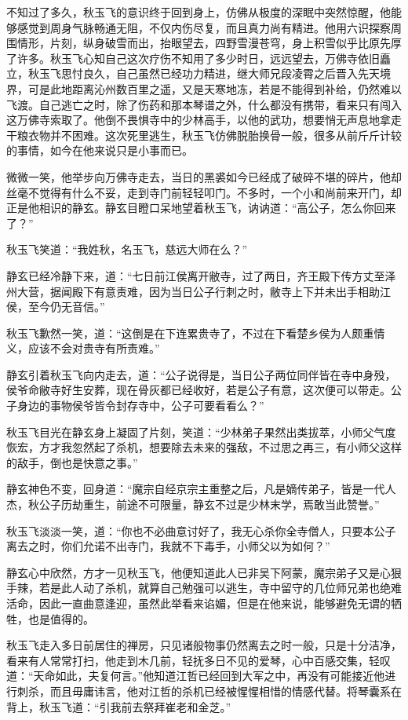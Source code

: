 不知过了多久，秋玉飞的意识终于回到身上，仿佛从极度的深眠中突然惊醒，他能够感觉到周身气脉畅通无阻，不仅内伤尽复，而且真力尚有精进。他用六识探察周围情形，片刻，纵身破雪而出，抬眼望去，四野雪漫苍穹，身上积雪似乎比原先厚了许多。秋玉飞心知自己这次疗伤不知用了多少时日，远远望去，万佛寺依旧矗立，秋玉飞思忖良久，自己虽然已经功力精进，继大师兄段凌霄之后晋入先天境界，可是此地距离沁州数百里之遥，又是天寒地冻，若是不能得到补给，仍然难以飞渡。自己逃亡之时，除了伤药和那本琴谱之外，什么都没有携带，看来只有闯入这万佛寺索取了。他倒不畏惧寺中的少林高手，以他的武功，想要悄无声息地拿走干粮衣物并不困难。这次死里逃生，秋玉飞仿佛脱胎换骨一般，很多从前斤斤计较的事情，如今在他来说只是小事而已。

微微一笑，他举步向万佛寺走去，当日的黑裘如今已经成了破碎不堪的碎片，他却丝毫不觉得有什么不妥，走到寺门前轻轻叩门。不多时，一个小和尚前来开门，却正是他相识的静玄。静玄目瞪口呆地望着秋玉飞，讷讷道：“高公子，怎么你回来了？”

秋玉飞笑道：“我姓秋，名玉飞，慈远大师在么？”

静玄已经冷静下来，道：“七日前江侯离开敝寺，过了两日，齐王殿下传方丈至泽州大营，据闻殿下有意责难，因为当日公子行刺之时，敝寺上下并未出手相助江侯，至今仍无音信。”

秋玉飞歉然一笑，道：“这倒是在下连累贵寺了，不过在下看楚乡侯为人颇重情义，应该不会对贵寺有所责难。”

静玄引着秋玉飞向内走去，道：“公子说得是，当日公子两位同伴皆在寺中身殁，侯爷命敝寺好生安葬，现在骨灰都已经收好，若是公子有意，这次便可以带走。公子身边的事物侯爷皆令封存寺中，公子可要看看么？”

秋玉飞目光在静玄身上凝固了片刻，笑道：“少林弟子果然出类拔萃，小师父气度恢宏，方才我忽然起了杀机，想要除去未来的强敌，不过思之再三，有小师父这样的敌手，倒也是快意之事。”

静玄神色不变，回身道：“魔宗自经京宗主重整之后，凡是嫡传弟子，皆是一代人杰，秋公子历劫重生，前途不可限量，静玄不过是少林末学，焉敢当此赞誉。”

秋玉飞淡淡一笑，道：“你也不必曲意讨好了，我无心杀你全寺僧人，只要本公子离去之时，你们允诺不出寺门，我就不下毒手，小师父以为如何？”

静玄心中欣然，方才一见秋玉飞，他便知道此人已非吴下阿蒙，魔宗弟子又是心狠手辣，若是此人动了杀机，就算自己勉强可以逃生，寺中留守的几位师兄弟也绝难活命，因此一直曲意逢迎，虽然此举看来谄媚，但是在他来说，能够避免无谓的牺牲，也是值得的。

秋玉飞走入多日前居住的禅房，只见诸般物事仍然离去之时一般，只是十分洁净，看来有人常常打扫，他走到木几前，轻抚多日不见的爱琴，心中百感交集，轻叹道：“天命如此，夫复何言。”他知道江哲已经回到大军之中，再没有可能接近他进行刺杀，而且毋庸讳言，他对江哲的杀机已经被惺惺相惜的情感代替。将琴囊系在背上，秋玉飞道：“引我前去祭拜崔老和金芝。”

